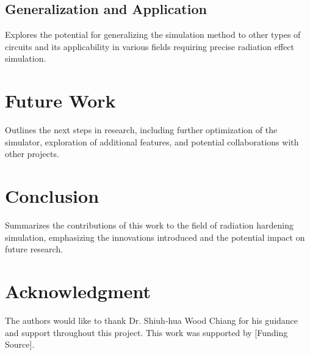 \documentclass[conference]{IEEEtran}
\begin{document}
\subsection{Generalization and Application}
Explores the potential for generalizing the simulation method to other types of circuits and its applicability in various fields requiring precise radiation effect simulation.

\section{Future Work}
Outlines the next steps in research, including further optimization of the simulator, exploration of additional features, and potential collaborations with other projects.

\section{Conclusion}
Summarizes the contributions of this work to the field of radiation hardening simulation, emphasizing the innovations introduced and the potential impact on future research.

\section*{Acknowledgment}
The authors would like to thank Dr. Shiuh-hua Wood Chiang for his guidance and support throughout this project. This work was supported by [Funding Source].



\end{document}
